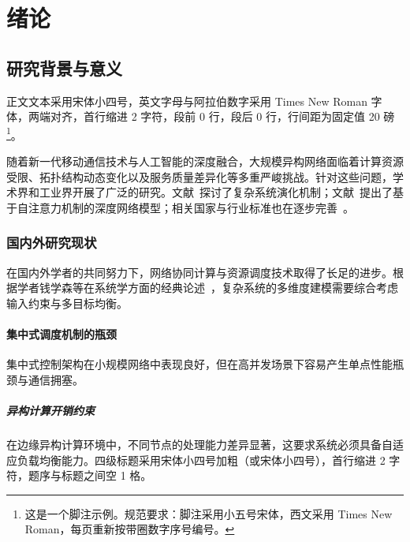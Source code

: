 
\chapter{绪论}

\section{研究背景与意义}

正文文本采用宋体小四号，英文字母与阿拉伯数字采用 Times New Roman 字体，两端对齐，首行缩进 2 字符，段前 0 行，段后 0 行，行间距为固定值 20 磅\footnote{这是一个脚注示例。规范要求：脚注采用小五号宋体，西文采用 Times New Roman，每页重新按带圈数字序号编号。}。

随着新一代移动通信技术与人工智能的深度融合，大规模异构网络面临着计算资源受限、拓扑结构动态变化以及服务质量差异化等多重严峻挑战。针对这些问题，学术界和工业界开展了广泛的研究。文献~\cite{yuanxunlai2012}探讨了复杂系统演化机制；文献~\cite{vaswani2017attention}提出了基于自注意力机制的深度网络模型；相关国家与行业标准也在逐步完善~\cite{gbt7714, gbt25100}。

\subsection{国内外研究现状}

在国内外学者的共同努力下，网络协同计算与资源调度技术取得了长足的进步。根据学者钱学森等在系统学方面的经典论述~\cite{qianxuesen2001}，复杂系统的多维度建模需要综合考虑输入约束与多目标均衡。

\subsubsection{集中式调度机制的瓶颈}

集中式控制架构在小规模网络中表现良好，但在高并发场景下容易产生单点性能瓶颈与通信拥塞。

\paragraph{异构计算开销约束}
在边缘异构计算环境中，不同节点的处理能力差异显著，这要求系统必须具备自适应负载均衡能力。四级标题采用宋体小四号加粗（或宋体小四号），首行缩进 2 字符，题序与标题之间空 1 格。

